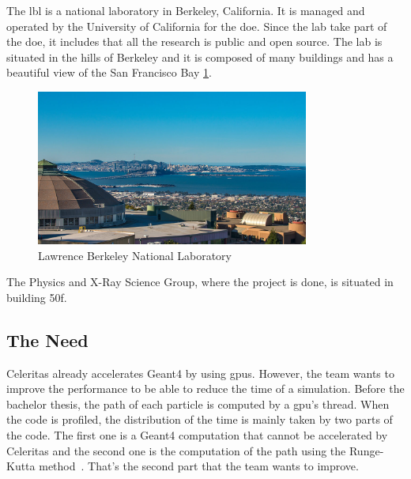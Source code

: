 The \acrfull{lbl} is a national laboratory in Berkeley, California.
It is managed and operated by the University of California for the \acrfull{doe}.
Since the lab take part of the \acrshort{doe}, it includes that all the research is public and open source.
The lab is situated in the hills of Berkeley and it is composed of many buildings and has a beautiful view of the San Francisco Bay \ref{spec:fig:context:lbl:lab-view}.

\begin{figure}[ht]
    \centering
    \includegraphics[width=0.8\textwidth]{05-resources/img/spec/lab-view.jpg}
    \caption{Lawrence Berkeley National Laboratory}
    \label{spec:fig:context:lbl:lab-view}
\end{figure}


The Physics and X-Ray Science Group, where the project is done, is situated in building 50f.


\subsection{The Need}
\label{spec:ch:context:celeritas:need}

Celeritas already accelerates Geant4 by using \acrshort{gpu}s.
However, the team wants to improve the performance to be able to reduce the time of a simulation.
Before the bachelor thesis, the path of each particle is computed by a \acrshort{gpu}'s thread.
When the code is profiled, the distribution of the time is mainly taken by two parts of the code.
The first one is a Geant4 computation that cannot be accelerated by Celeritas and the second one is the computation of the path using the Runge-Kutta method~\cite{Runge-Kutta-methods}.
That's the second part that the team wants to improve.

